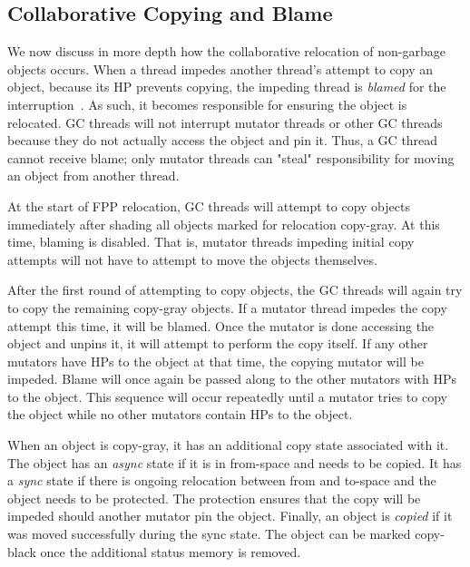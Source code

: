 \documentclass{sig-alternate}
\begin{document}
\subsection{Collaborative Copying and Blame}
\label{sec:fppCopy}

We now discuss in more depth how the collaborative relocation of 
non-garbage objects occurs. When a thread impedes another thread's
attempt to copy an object, because its HP prevents copying,
the impeding thread is \emph{blamed} for the 
interruption~\cite{Osterlund:FPP}. As such, it becomes responsible for ensuring 
the object is relocated. GC threads will not interrupt
mutator threads or other GC threads because they do not actually access 
the object and pin it. Thus, a GC thread cannot receive blame;
only mutator threads can "steal" responsibility for moving an object
from another thread. 

At the start of FPP relocation, GC threads will attempt to copy
objects immediately after shading all objects marked for relocation
copy-gray. At this time, blaming is disabled. That is, mutator threads
impeding initial copy attempts will not have to attempt to move the objects
themselves. 

After the first round of attempting to copy objects, the GC threads
will again try to copy the remaining copy-gray objects. If a mutator 
thread impedes the copy attempt this time, it will be blamed. 
Once the mutator is done accessing the
object and unpins it, it will attempt to perform the copy itself. If 
any other mutators have HPs to the object at that time, the copying mutator 
will be impeded. Blame will once again be passed
along to the other mutators with HPs to the object. This sequence will
occur repeatedly until a mutator tries to copy the object while no other
mutators contain HPs to the object. 

When an object is copy-gray, it has an additional copy state associated
with it. The object has an \emph{async} state if it is in from-space
and needs to be copied. It has a \emph{sync} state if there is
ongoing relocation between from and to-space and the object needs to
be protected. The protection ensures that the copy will be impeded 
should another mutator pin the object. 
Finally, an object is \emph{copied} if it was moved
successfully during the sync state. The object can be marked
copy-black once the additional status memory is removed.
\end{document}
